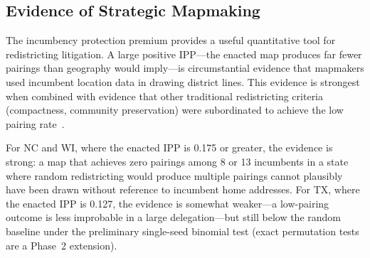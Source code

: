 \subsection{Evidence of Strategic Mapmaking}

The incumbency protection premium provides a useful quantitative tool for redistricting
litigation. A large positive IPP---the enacted map produces far fewer pairings than
geography would imply---is circumstantial evidence that mapmakers used incumbent
location data in drawing district lines. This evidence is strongest when combined with
evidence that other traditional redistricting criteria (compactness, community
preservation) were subordinated to achieve the low pairing rate~\citep{mcghee2014measuring}.

For NC and WI, where the enacted IPP is 0.175 or greater, the evidence is strong:
a map that achieves zero pairings among 8 or 13 incumbents in a state where random
redistricting would produce multiple pairings cannot plausibly have been drawn without
reference to incumbent home addresses. For TX, where the enacted IPP is 0.127, the
evidence is somewhat weaker---a low-pairing outcome is less improbable in a large
delegation---but still below the random baseline under the preliminary single-seed binomial test (exact permutation tests are a Phase~2 extension).

